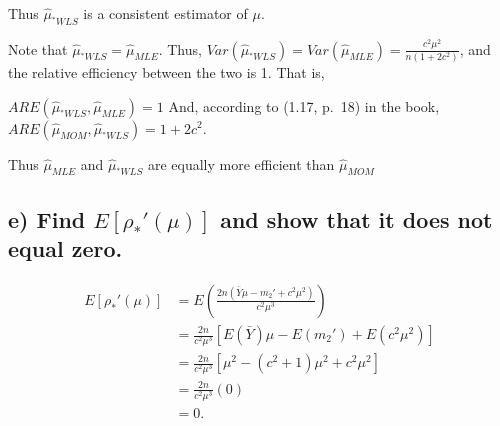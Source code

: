 \documentclass[
  letterpaper,
  DIV=11,
  numbers=noendperiod]{scrreprt}
\begin{document}
Thus \(\hat{\mu}_{^*{WLS}}\) is a consistent estimator of \(\mu\).

Note that \(\hat{\mu}_{^*{WLS}} = \hat{\mu}_{MLE}\). Thus,
\(Var(\hat{\mu}_{^*{WLS}}) = Var(\hat{\mu}_{MLE}) = \frac{c^2\mu^2}{n(1+2c^2)}\),
and the relative efficiency between the two is 1. That is,

\(ARE(\hat{\mu}_{^*{WLS}}, \hat{\mu}_{MLE}) =1\) And, according to
(1.17, p.~18) in the book,
\(ARE(\hat{\mu}_{MOM}, \hat{\mu}_{^*WLS}) =1+2c^2\).

Thus \(\hat{\mu}_{MLE}\) and \(\hat{\mu}_{^*{WLS}}\) are equally more
efficient than \(\hat{\mu}_{MOM}\)

\hypertarget{e-find-erho_-mu-and-show-that-it-does-not-equal-zero.}{%
\subsection{\texorpdfstring{e) Find \(E[\rho_* ' (\mu)]\) and show that
it does not equal
zero.}{e) Find E{[}\textbackslash rho\_* \textquotesingle{} (\textbackslash mu){]} and show that it does not equal zero.}}\label{e-find-erho_-mu-and-show-that-it-does-not-equal-zero.}}

\[
\begin{aligned}
E[\rho_* ' (\mu)] &= E\left(\frac{2n(\bar{Y}\mu -m_2'+c^2\mu^2)}{c^2\mu^3}\right) \\
&= \frac{2n}{c^2\mu^3}\left[E(\bar{Y})\mu -E(m_2') +E(c^2\mu^2)\right] \\
&= \frac{2n}{c^2\mu^3}\left[\mu^2 -(c^2+1)\mu^2 +c^2\mu^2\right]\\
&= \frac{2n}{c^2\mu^3}(0) \\
&=0.
\end{aligned}
\]

\newpage
\end{document}
